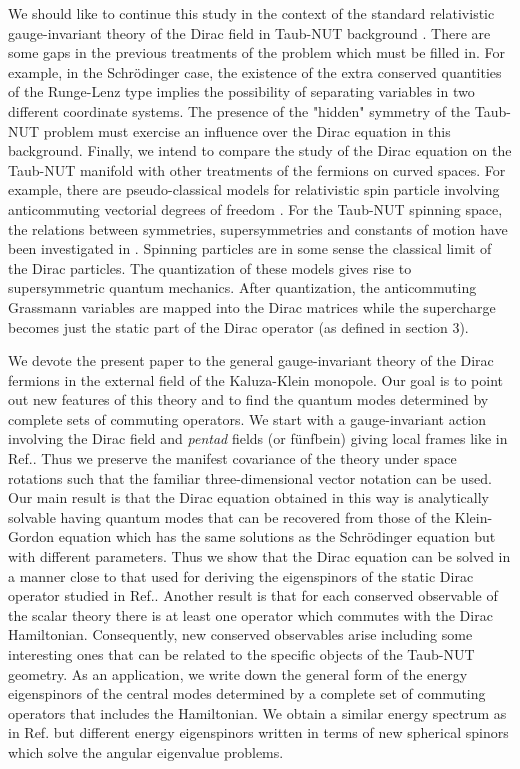 \documentclass[a4paper,12pt]{article}
\begin{document}
We should like to continue this study in the context of the standard 
relativistic gauge-invariant theory \cite{W,BD} of the Dirac field in 
Taub-NUT background \cite{DIRAC}. There are some gaps in the previous 
treatments of the problem which must be filled in. For example, in the 
Schr\" odinger case, the existence of the extra conserved quantities of 
the Runge-Lenz type implies the possibility of separating variables in 
two different coordinate systems. The presence of the "hidden" symmetry 
of the Taub-NUT problem must exercise an influence over the Dirac 
equation in this background. Finally, we intend to compare the study of 
the Dirac equation on the Taub-NUT manifold with other treatments of 
the fermions on curved spaces. For example, there are pseudo-classical 
models for relativistic spin \coordHE{} particle involving anticommuting 
vectorial degrees of freedom \cite{grass}. For the Taub-NUT spinning 
space, the relations between symmetries, supersymmetries and constants 
of motion have been investigated in \cite{G3}. Spinning particles are in 
some sense the classical limit of the Dirac particles. The quantization of 
these models gives rise to supersymmetric quantum mechanics. After 
quantization, the anticommuting Grassmann variables are mapped into the 
Dirac matrices while the  supercharge becomes just the static part of 
the Dirac operator (as defined in section 3). 


We devote the present paper to the general \coordHE{} gauge-invariant theory 
of the Dirac fermions \cite{DKK} in the external field of the Kaluza-Klein 
monopole\cite{DIRAC}. Our goal is to point out new  features of this theory 
and to find  the quantum modes determined by complete sets of commuting 
operators. We start with a gauge-invariant action involving the Dirac field 
and {\em pentad} fields (or f\" unfbein) giving local frames like in 
Ref.\cite{P}. Thus we  preserve the manifest covariance of the theory under 
space rotations such that the  familiar three-dimensional vector notation can 
be used. Our main result is that the Dirac equation obtained in this way 
\cite{DIRAC} is analytically solvable having quantum modes that can be 
recovered from those of the Klein-Gordon equation which has the same solutions 
as the Schr\" odinger equation \cite{CV} but with different parameters. Thus 
we show that the Dirac equation can be solved in a manner close to that used 
for deriving the eigenspinors of the static Dirac operator studied in 
Ref.\cite{CH}. Another result is that for each conserved observable of the 
scalar theory there is  at least one operator which commutes with the Dirac 
Hamiltonian. Consequently, new conserved observables arise including some 
interesting ones that can be related to the specific objects of the Taub-NUT 
geometry. As an application, we write down the general form of the energy 
eigenspinors of the central modes determined by a complete set of commuting 
operators that includes the Hamiltonian. We obtain a similar energy spectrum 
as in Ref.\cite{CH} but different energy eigenspinors written in terms of new 
spherical spinors which solve the angular eigenvalue problems. 
\end{document}

